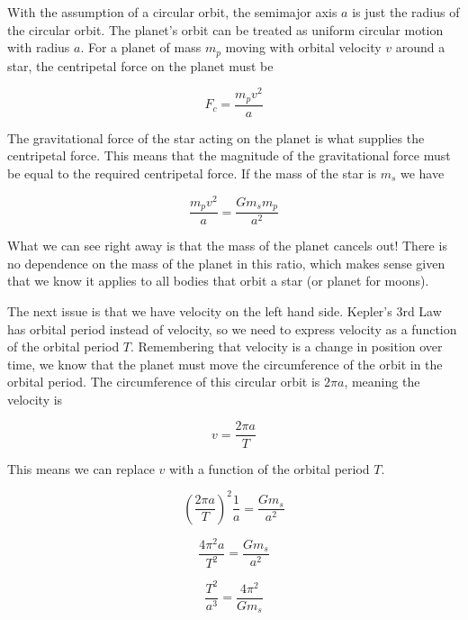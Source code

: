 \documentclass[12pt]{book}
\begin{document}
With the assumption of a circular orbit, the semimajor axis $a$ is just the radius of the circular orbit. The planet's orbit can be treated as uniform circular motion with radius $a$. For a planet of mass $m_p$ moving with orbital velocity $v$ around a star, the centripetal force on the planet must be

\begin{equation}
F_c = \frac{m_p v^2}{a}
\end{equation}

The gravitational force of the star acting on the planet is what supplies the centripetal force. This means that the magnitude of the gravitational force must be equal to the required centripetal force. If the mass of the star is $m_s$ we have

\begin{equation}
\frac{m_p v^2}{a} = \frac{G m_s m_p}{a^2}
\end{equation}

What we can see right away is that the mass of the planet cancels out! There is no dependence on the mass of the planet in this ratio, which makes sense given that we know it applies to all bodies that orbit a star (or planet for moons). 

The next issue is that we have velocity on the left hand side. Kepler's 3rd Law has orbital period instead of velocity, so we need to express velocity as a function of the orbital period $T$. Remembering that velocity is a change in position over time, we know that the planet must move the circumference of the orbit in the orbital period. The circumference of this circular orbit is $2 \pi a$, meaning the velocity is

\begin{equation}
v = \frac{2 \pi a}{T}
\end{equation}

This means we can replace $v$ with a function of the orbital period $T$.

\begin{equation}
\left( \frac{2 \pi a}{T} \right)^2 \frac{1}{a} = \frac{G m_s}{a^2}
\end{equation}

\begin{equation}
\frac{4 \pi^2 a}{T^2} = \frac{G m_s}{a^2}
\end{equation}

\begin{equation}
\frac{T^2}{a^3} = \frac{4 \pi^2}{G m_s}
\label{newtonkepler}
\end{equation}
\end{document}
